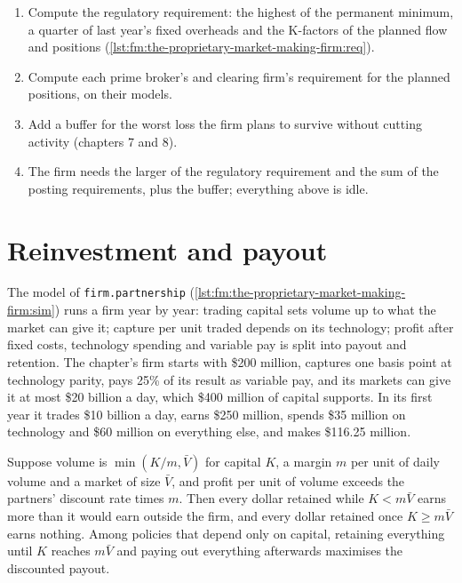 \begin{method}\label{met:fm:the-proprietary-market-making-firm:size}
\begin{enumerate}
\item Compute the regulatory requirement: the highest of the permanent minimum, a quarter of last year's fixed overheads and the K-factors of the
planned flow and positions (\cref{lst:fm:the-proprietary-market-making-firm:req}).
\item Compute each prime broker's and clearing firm's requirement for the planned positions, on their models.
\item Add a buffer for the worst loss the firm plans to survive without cutting activity (chapters 7 and 8).
\item The firm needs the larger of the regulatory requirement and the sum of the posting requirements, plus the buffer; everything above is idle.
\end{enumerate}
\end{method}

\label{lst:fm:the-proprietary-market-making-firm:req}

\section{Reinvestment and payout}

The model of \texttt{firm.partnership} (\cref{lst:fm:the-proprietary-market-making-firm:sim}) runs a firm year by year: trading capital sets volume up
to what the market can give it; capture per unit traded depends on its technology; profit after fixed costs, technology spending and variable pay
is split into payout and retention. The chapter's firm starts with \$200 million, captures one basis point at technology parity, pays 25\% of its
result as variable pay, and its markets can give it at most \$20 billion a day, which \$400 million of capital supports. In its first year it trades
\$10 billion a day, earns \$250 million, spends \$35 million on technology and \$60 million on everything else, and makes \$116.25 million.

\label{lst:fm:the-proprietary-market-making-firm:sim}

\begin{proposition}\label{prop:fm:the-proprietary-market-making-firm:retain}
Suppose volume is $\min(K/m,\bar V)$ for capital $K$, a margin $m$ per unit of daily volume and a market of size $\bar V$, and profit per unit of
volume exceeds the partners' discount rate times $m$. Then every dollar retained while $K<m\bar V$ earns more than it would earn outside the firm,
and every dollar retained once $K\ge m\bar V$ earns nothing. Among policies that depend only on capital, retaining everything until $K$ reaches
$m\bar V$ and paying out everything afterwards maximises the discounted payout.
\end{proposition}

